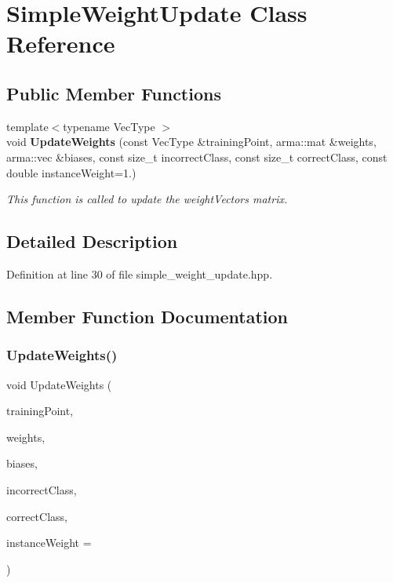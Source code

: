 \section{Simple\+Weight\+Update Class Reference}
\label{classmlpack_1_1perceptron_1_1SimpleWeightUpdate}
\subsection*{Public Member Functions}
\begin{DoxyCompactItemize}
\item 
{\footnotesize template$<$typename Vec\+Type $>$ }\\void \textbf{ Update\+Weights} (const Vec\+Type \&training\+Point, arma\+::mat \&weights, arma\+::vec \&biases, const size\+\_\+t incorrect\+Class, const size\+\_\+t correct\+Class, const double instance\+Weight=1.)
\begin{DoxyCompactList}\small\item\em This function is called to update the weight\+Vectors matrix. \end{DoxyCompactList}\end{DoxyCompactItemize}


\subsection{Detailed Description}


Definition at line 30 of file simple\+\_\+weight\+\_\+update.\+hpp.



\subsection{Member Function Documentation}
\mbox{\label{classmlpack_1_1perceptron_1_1SimpleWeightUpdate_a7b1c46d63b5a01a38e99ec033bfbe078}} 
\subsubsection{Update\+Weights()}
{\footnotesize\ttfamily void Update\+Weights (\begin{DoxyParamCaption}\item[{const Vec\+Type \&}]{training\+Point,  }\item[{arma\+::mat \&}]{weights,  }\item[{arma\+::vec \&}]{biases,  }\item[{const size\+\_\+t}]{incorrect\+Class,  }\item[{const size\+\_\+t}]{correct\+Class,  }\item[{const double}]{instance\+Weight = {} }\end{DoxyParamCaption})\hspace{0.3cm}{\ttfamily [inline]}}



